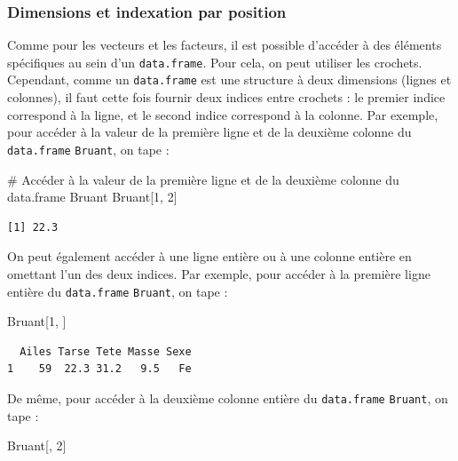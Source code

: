\documentclass[
  a4paper,
  DIV=11,
  numbers=noendperiod,
  oneside]{scrreprt}
\newenvironment{Shaded}{}{}
\newcommand{\CommentTok}[1]{\textcolor[rgb]{0.42,0.45,0.49}{#1}}
\newcommand{\DecValTok}[1]{\textcolor[rgb]{0.00,0.36,0.77}{#1}}
\newcommand{\NormalTok}[1]{\textcolor[rgb]{0.14,0.16,0.18}{#1}}
\begin{document}
\subsubsection{Dimensions et indexation par
position}\label{dimensions-et-indexation-par-position}

Comme pour les vecteurs et les facteurs, il est possible d'accéder à des
éléments spécifiques au sein d'un \texttt{data.frame}. Pour cela, on
peut utiliser les crochets. Cependant, comme un \texttt{data.frame} est
une structure à deux dimensions (lignes et colonnes), il faut cette fois
fournir deux indices entre crochets : le premier indice correspond à la
ligne, et le second indice correspond à la colonne. Par exemple, pour
accéder à la valeur de la première ligne et de la deuxième colonne du
\texttt{data.frame} \texttt{Bruant}, on tape :

\begin{Shaded}
\begin{Highlighting}[]
\CommentTok{\# Accéder à la valeur de la première ligne et de la deuxième colonne du data.frame Bruant}
\NormalTok{Bruant[}\DecValTok{1}\NormalTok{, }\DecValTok{2}\NormalTok{]}
\end{Highlighting}
\end{Shaded}

\begin{verbatim}
[1] 22.3
\end{verbatim}

On peut également accéder à une ligne entière ou à une colonne entière
en omettant l'un des deux indices. Par exemple, pour accéder à la
première ligne entière du \texttt{data.frame} \texttt{Bruant}, on tape :

\begin{Shaded}
\begin{Highlighting}[]
\NormalTok{Bruant[}\DecValTok{1}\NormalTok{, ]}
\end{Highlighting}
\end{Shaded}

\begin{verbatim}
  Ailes Tarse Tete Masse Sexe
1    59  22.3 31.2   9.5   Fe
\end{verbatim}

De même, pour accéder à la deuxième colonne entière du
\texttt{data.frame} \texttt{Bruant}, on tape :

\begin{Shaded}
\begin{Highlighting}[]
\NormalTok{Bruant[, }\DecValTok{2}\NormalTok{]}
\end{Highlighting}
\end{Shaded}
\end{document}
